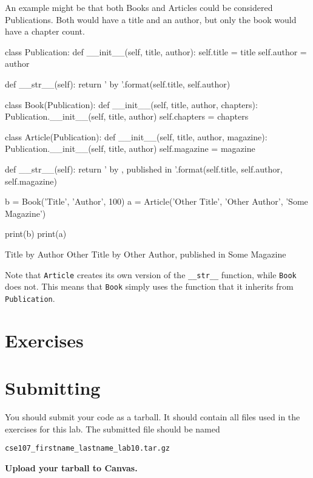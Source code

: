 \documentclass[11pt]{cselabheader}
\begin{document}
An example
might be that both Books and Articles could be considered Publications. Both
would have a title and an author, but only the book would have a chapter count.

\begin{python3code}
class Publication:
    def __init__(self, title, author):
        self.title = title
        self.author = author

    def __str__(self):
        return '{} by {}'.format(self.title, self.author)

class Book(Publication):
    def __init__(self, title, author, chapters):
        Publication.__init__(self, title, author)
        self.chapters = chapters

class Article(Publication):
    def __init__(self, title, author, magazine):
        Publication.__init__(self, title, author)
        self.magazine = magazine

    def __str__(self):
        return '{} by {}, published in {}'.format(self.title, self.author,
            self.magazine)

b = Book('Title', 'Author', 100)
a = Article('Other Title', 'Other Author', 'Some Magazine')

print(b)
print(a)
\end{python3code}

\begin{pyconcode}
Title by Author
Other Title by Other Author, published in Some Magazine
\end{pyconcode}

Note that \lstinline{Article} creates its own version of the \lstinline{__str__}
function, while \lstinline{Book} does not. This means that \lstinline{Book}
simply uses the function that it inherits from \lstinline{Publication}.


\clearpage
\section{Exercises}
\label{sec:ex}



\pagebreak
\section{Submitting}
You should submit your code as a tarball. It should contain all files
used in the exercises for this lab. The submitted file should be named
\begin{center}
  \texttt{cse107\_firstname\_lastname\_lab10.tar.gz}
\end{center}

\begin{center}
  \textbf{Upload your tarball to Canvas.}
\end{center}

\listoftheorems
\end{document}
